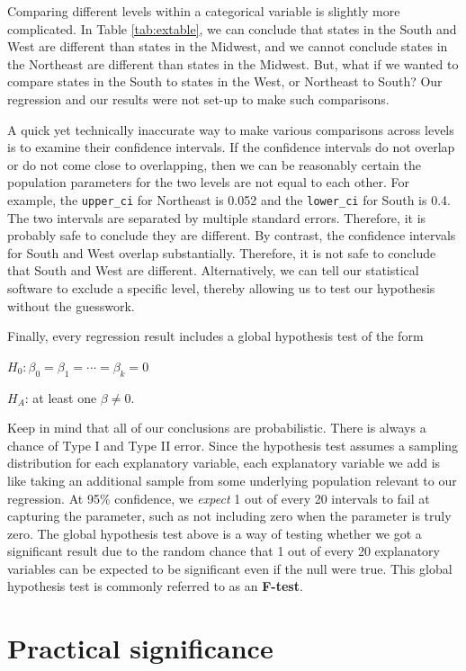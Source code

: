 \documentclass[
]{book}
\begin{document}
Comparing different levels within a categorical variable is slightly more complicated. In Table \ref{tab:extable}, we can conclude that states in the South and West are different than states in the Midwest, and we cannot conclude states in the Northeast are different than states in the Midwest. But, what if we wanted to compare states in the South to states in the West, or Northeast to South? Our regression and our results were not set-up to make such comparisons.

A quick yet technically inaccurate way to make various comparisons across levels is to examine their confidence intervals. If the confidence intervals do not overlap or do not come close to overlapping, then we can be reasonably certain the population parameters for the two levels are not equal to each other. For example, the \texttt{upper\_ci} for Northeast is 0.052 and the \texttt{lower\_ci} for South is 0.4. The two intervals are separated by multiple standard errors. Therefore, it is probably safe to conclude they are different. By contrast, the confidence intervals for South and West overlap substantially. Therefore, it is not safe to conclude that South and West are different. Alternatively, we can tell our statistical software to exclude a specific level, thereby allowing us to test our hypothesis without the guesswork.

Finally, every regression result includes a global hypothesis test of the form

\(H_0: \beta_0 = \beta_1 = \cdots = \beta_k = 0\)

\(H_A\): at least one \(\beta \neq 0\).

Keep in mind that all of our conclusions are probabilistic. There is always a chance of Type I and Type II error. Since the hypothesis test assumes a sampling distribution for each explanatory variable, each explanatory variable we add is like taking an additional sample from some underlying population relevant to our regression. At 95\% confidence, we \emph{expect} 1 out of every 20 intervals to fail at capturing the parameter, such as not including zero when the parameter is truly zero. The global hypothesis test above is a way of testing whether we got a significant result due to the random chance that 1 out of every 20 explanatory variables can be expected to be significant even if the null were true. This global hypothesis test is commonly referred to as an \textbf{F-test}.

\hypertarget{practical-significance}{%
\section{Practical significance}\label{practical-significance}}
\end{document}
